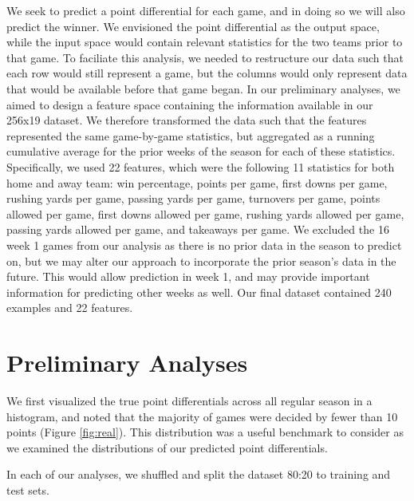 \documentclass{article}
\begin{document}
We seek to predict a point differential for each game, and in doing so we will also predict the winner. We envisioned the point differential as the output space, while the input space would contain relevant statistics for the two teams prior to that game. To faciliate this analysis, we needed to restructure our data such that each row would still represent a game, but the columns would only represent data that would be available before that game began. In our preliminary analyses, we aimed to design a feature space containing the information available in our 256x19 dataset. We therefore transformed the data such that the features represented the same game-by-game statistics, but aggregated as a running cumulative average for the prior weeks of the season for each of these statistics. Specifically, we used 22 features, which were the following 11 statistics for both home and away team: win percentage, points per game, first downs per game, rushing yards per game, passing yards per game, turnovers per game, points allowed per game, first downs allowed per game, rushing yards allowed per game, passing yards allowed per game, and takeaways per game.
We excluded the 16 week 1 games from our analysis as there is no prior data in the season to predict on, but we may alter our approach to incorporate the prior season's data in the future. This would allow prediction in week 1, and may provide important information for predicting other weeks as well. Our final dataset contained 240 examples and 22 features.

\section{Preliminary Analyses}
We first visualized the true point differentials across all regular season in a histogram, and noted that the majority of games were decided by fewer than 10 points (Figure \ref{fig:real}). This distribution was a useful benchmark to consider as we examined the distributions of our predicted point differentials.

In each of our analyses, we shuffled and split the dataset 80:20 to training and test sets.
\end{document}
